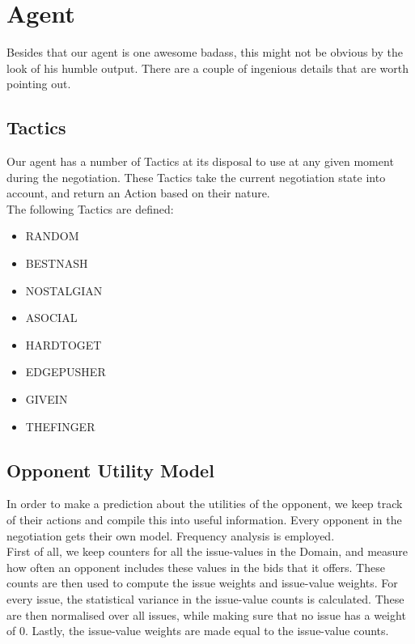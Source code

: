\section{Agent}
Besides that our agent is one awesome badass, this might not be obvious by the look of his humble output. There are a couple of ingenious details that are worth pointing out.

\subsection{Tactics}
Our agent has a number of Tactics at its disposal to use at any given moment during the negotiation. These Tactics take the current negotiation state into account, and return an Action based on their nature. \\

\noindent The following Tactics are defined:
\begin{itemize}
\item RANDOM
\item BESTNASH
\item NOSTALGIAN
\item ASOCIAL
\item HARDTOGET
\item EDGEPUSHER
\item GIVEIN
\item THEFINGER
\end{itemize}

\subsection{Opponent Utility Model}
\label{sec:opponentutilitymodel}
In order to make a prediction about the utilities of the opponent, we keep track of their actions and compile this into useful information. Every opponent in the negotiation gets their own model. Frequency analysis is employed.\\

First of all, we keep counters for all the issue-values in the Domain, and measure how often an opponent includes these values in the bids that it offers. These counts are then used to compute the issue weights and issue-value weights. For every issue, the statistical variance in the issue-value counts is calculated. These are then normalised over all issues, while making sure that no issue has a weight of 0. Lastly, the issue-value weights are made equal to the issue-value counts.


